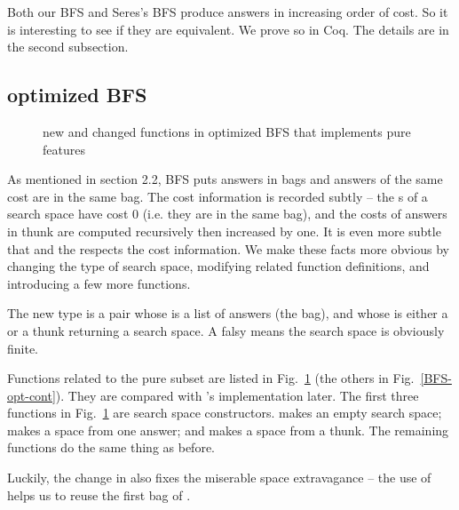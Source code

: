 \documentclass[format=acmlarge, review=true, authordraft=true]{acmart}
\begin{document}
Both our BFS and Seres's BFS \citet{seres1999algebra} produce answers in 
increasing order of cost. So it is interesting to see if they are equivalent. 
We prove so in Coq. The details are in the second subsection.

\subsection{optimized BFS}

\begin{figure}
	\caption{new and changed functions in optimized BFS that implements pure 
	features}
	\label{BFS-opt}
\end{figure}


As mentioned in section 2.2, BFS puts answers in bags and answers of the 
same cost are in the same bag. The cost
information is recorded subtly -- the s of a search space have cost 
0 (i.e. they are in the same bag), and the costs of answers in thunk are 
computed recursively then increased by one. It is even more subtle that
 and the  respects the cost 
information. We make these facts more obvious by changing the type of search 
space, modifying related function definitions, and introducing a few more 
functions.

The new type is a pair whose  is a list of answers (the bag), and 
whose  is either a  or a thunk returning a search 
space. A falsy  means the search space is obviously finite. 

Functions related to the pure subset are listed in Fig.~\ref{BFS-opt} (the 
others in Fig.~\ref{BFS-opt-cont}). They are compared with 
\citeauthor{seres1999algebra}'s implementation later. The first three functions 
in Fig.~\ref{BFS-opt} are search space constructors.  makes an 
empty search space;  makes a space from one answer; and 
 makes a space from a thunk. The remaining functions do the same 
thing as before. 

Luckily, the change in  also fixes the miserable space 
extravagance -- the use of  helps us to reuse the first bag of 
.
\end{document}

